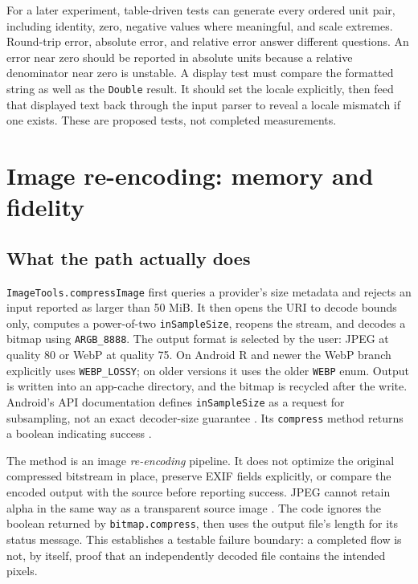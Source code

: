 \documentclass[10pt,letterpaper]{article}
\begin{document}
For a later experiment, table-driven tests can generate every ordered unit pair, including identity, zero, negative values where meaningful, and scale extremes. Round-trip error, absolute error, and relative error answer different questions. An error near zero should be reported in absolute units because a relative denominator near zero is unstable. A display test must compare the formatted string as well as the \texttt{Double} result. It should set the locale explicitly, then feed that displayed text back through the input parser to reveal a locale mismatch if one exists. These are proposed tests, not completed measurements.

\section{Image re-encoding: memory and fidelity}

\subsection{What the path actually does}

\texttt{ImageTools.compressImage} first queries a provider's size metadata and rejects an input reported as larger than 50 MiB. It then opens the URI to decode bounds only, computes a power-of-two \texttt{inSampleSize}, reopens the stream, and decodes a bitmap using \texttt{ARGB\_8888}. The output format is selected by the user: JPEG at quality 80 or WebP at quality 75. On Android R and newer the WebP branch explicitly uses \texttt{WEBP\_LOSSY}; on older versions it uses the older \texttt{WEBP} enum. Output is written into an app-cache directory, and the bitmap is recycled after the write. Android's API documentation defines \texttt{inSampleSize} as a request for subsampling, not an exact decoder-size guarantee \cite{bitmapoptions}. Its \texttt{compress} method returns a boolean indicating success \cite{bitmap}.

The method is an image \emph{re-encoding} pipeline. It does not optimize the original compressed bitstream in place, preserve EXIF fields explicitly, or compare the encoded output with the source before reporting success. JPEG cannot retain alpha in the same way as a transparent source image \cite{bitmap}. The code ignores the boolean returned by \texttt{bitmap.compress}, then uses the output file's length for its status message. This establishes a testable failure boundary: a completed flow is not, by itself, proof that an independently decoded file contains the intended pixels.
\end{document}
